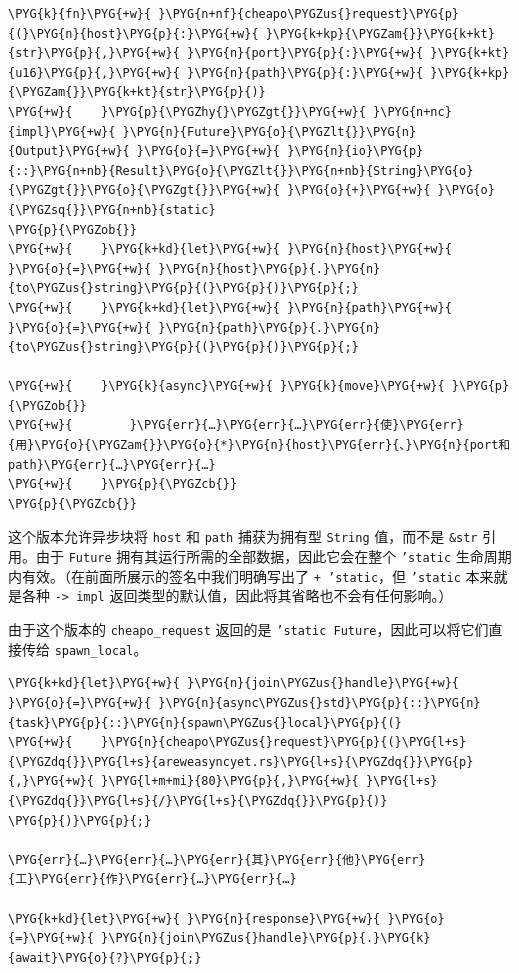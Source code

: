 \begin{Verbatim}[commandchars=\\\{\},breaklines=true,breakanywhere=true,fontsize=\codefont,xleftmargin=17bp]
\PYG{k}{fn}\PYG{+w}{ }\PYG{n+nf}{cheapo\PYGZus{}request}\PYG{p}{(}\PYG{n}{host}\PYG{p}{:}\PYG{+w}{ }\PYG{k+kp}{\PYGZam{}}\PYG{k+kt}{str}\PYG{p}{,}\PYG{+w}{ }\PYG{n}{port}\PYG{p}{:}\PYG{+w}{ }\PYG{k+kt}{u16}\PYG{p}{,}\PYG{+w}{ }\PYG{n}{path}\PYG{p}{:}\PYG{+w}{ }\PYG{k+kp}{\PYGZam{}}\PYG{k+kt}{str}\PYG{p}{)}
\PYG{+w}{    }\PYG{p}{\PYGZhy{}\PYGZgt{}}\PYG{+w}{ }\PYG{n+nc}{impl}\PYG{+w}{ }\PYG{n}{Future}\PYG{o}{\PYGZlt{}}\PYG{n}{Output}\PYG{+w}{ }\PYG{o}{=}\PYG{+w}{ }\PYG{n}{io}\PYG{p}{::}\PYG{n+nb}{Result}\PYG{o}{\PYGZlt{}}\PYG{n+nb}{String}\PYG{o}{\PYGZgt{}}\PYG{o}{\PYGZgt{}}\PYG{+w}{ }\PYG{o}{+}\PYG{+w}{ }\PYG{o}{\PYGZsq{}}\PYG{n+nb}{static}
\PYG{p}{\PYGZob{}}
\PYG{+w}{    }\PYG{k+kd}{let}\PYG{+w}{ }\PYG{n}{host}\PYG{+w}{ }\PYG{o}{=}\PYG{+w}{ }\PYG{n}{host}\PYG{p}{.}\PYG{n}{to\PYGZus{}string}\PYG{p}{(}\PYG{p}{)}\PYG{p}{;}
\PYG{+w}{    }\PYG{k+kd}{let}\PYG{+w}{ }\PYG{n}{path}\PYG{+w}{ }\PYG{o}{=}\PYG{+w}{ }\PYG{n}{path}\PYG{p}{.}\PYG{n}{to\PYGZus{}string}\PYG{p}{(}\PYG{p}{)}\PYG{p}{;}

\PYG{+w}{    }\PYG{k}{async}\PYG{+w}{ }\PYG{k}{move}\PYG{+w}{ }\PYG{p}{\PYGZob{}}
\PYG{+w}{        }\PYG{err}{…}\PYG{err}{…}\PYG{err}{使}\PYG{err}{用}\PYG{o}{\PYGZam{}}\PYG{o}{*}\PYG{n}{host}\PYG{err}{、}\PYG{n}{port和path}\PYG{err}{…}\PYG{err}{…}
\PYG{+w}{    }\PYG{p}{\PYGZcb{}}
\PYG{p}{\PYGZcb{}}
\end{Verbatim}

这个版本允许异步块将 \texttt{host} 和 \texttt{path} 捕获为拥有型 \texttt{String} 值，而不是 \texttt{\&str} 引用。由于 \texttt{Future} 拥有其运行所需的全部数据，因此它会在整个 \texttt{'static} 生命周期内有效。（在前面所展示的签名中我们明确写出了 \texttt{+ 'static}，但 \texttt{'static} 本来就是各种 \texttt{-> impl} 返回类型的默认值，因此将其省略也不会有任何影响。）

由于这个版本的 \texttt{cheapo\_request} 返回的是 \texttt{'static Future}，因此可以将它们直接传给 \texttt{spawn\_local}。

\begin{Verbatim}[commandchars=\\\{\},breaklines=true,breakanywhere=true,fontsize=\codefont,xleftmargin=17bp]
\PYG{k+kd}{let}\PYG{+w}{ }\PYG{n}{join\PYGZus{}handle}\PYG{+w}{ }\PYG{o}{=}\PYG{+w}{ }\PYG{n}{async\PYGZus{}std}\PYG{p}{::}\PYG{n}{task}\PYG{p}{::}\PYG{n}{spawn\PYGZus{}local}\PYG{p}{(}
\PYG{+w}{    }\PYG{n}{cheapo\PYGZus{}request}\PYG{p}{(}\PYG{l+s}{\PYGZdq{}}\PYG{l+s}{areweasyncyet.rs}\PYG{l+s}{\PYGZdq{}}\PYG{p}{,}\PYG{+w}{ }\PYG{l+m+mi}{80}\PYG{p}{,}\PYG{+w}{ }\PYG{l+s}{\PYGZdq{}}\PYG{l+s}{/}\PYG{l+s}{\PYGZdq{}}\PYG{p}{)}
\PYG{p}{)}\PYG{p}{;}

\PYG{err}{…}\PYG{err}{…}\PYG{err}{其}\PYG{err}{他}\PYG{err}{工}\PYG{err}{作}\PYG{err}{…}\PYG{err}{…}

\PYG{k+kd}{let}\PYG{+w}{ }\PYG{n}{response}\PYG{+w}{ }\PYG{o}{=}\PYG{+w}{ }\PYG{n}{join\PYGZus{}handle}\PYG{p}{.}\PYG{k}{await}\PYG{o}{?}\PYG{p}{;}
\end{Verbatim}

